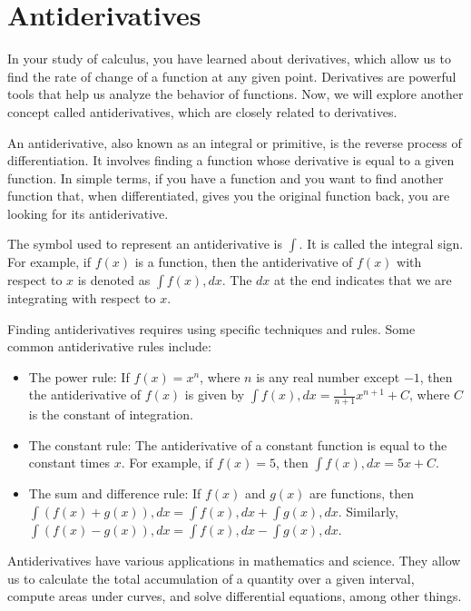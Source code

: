 \chapter{Antiderivatives}

In your study of calculus, you have learned about derivatives, which allow us to find the rate of change of a function at any given point. Derivatives are powerful tools that help us analyze the behavior of functions. Now, we will explore another concept called antiderivatives, which are closely related to derivatives.

An antiderivative, also known as an integral or primitive, is the reverse process of differentiation. It involves finding a function whose derivative is equal to a given function. In simple terms, if you have a function and you want to find another function that, when differentiated, gives you the original function back, you are looking for its antiderivative.

The symbol used to represent an antiderivative is $\int$. It is called the integral sign. For example, if $f(x)$ is a function, then the antiderivative of $f(x)$ with respect to $x$ is denoted as $\int f(x) , dx$. The $dx$ at the end indicates that we are integrating with respect to $x$.

Finding antiderivatives requires using specific techniques and rules. Some common antiderivative rules include:

\begin{itemize}
\item The power rule: If $f(x) = x^n$, where $n$ is any real number except $-1$, then the antiderivative of $f(x)$ is given by $\int f(x) , dx = \frac{1}{n+1}x^{n+1} + C$, where $C$ is the constant of integration.

\item The constant rule: The antiderivative of a constant function is equal to the constant times $x$. For example, if $f(x) = 5$, then $\int f(x) , dx = 5x + C$.

\item The sum and difference rule: If $f(x)$ and $g(x)$ are functions, then $\int (f(x) + g(x)) , dx = \int f(x) , dx + \int g(x) , dx$. Similarly, $\int (f(x) - g(x)) , dx = \int f(x) , dx - \int g(x) , dx$.
\end{itemize}

Antiderivatives have various applications in mathematics and science. They allow us to calculate the total accumulation of a quantity over a given interval, compute areas under curves, and solve differential equations, among other things.

